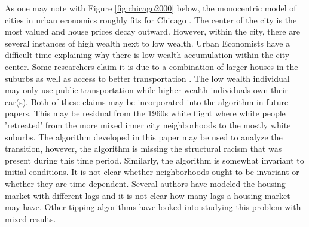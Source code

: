 \documentclass[11pt]{asaproc}
\newcommand{\1}{\mathbb{1}}
\begin{document}
As one may note with Figure \ref{fig:chicago2000} below, the monocentric model of cities in urban economics roughly fits for Chicago \citep{brueckner87}. The center of the city is the most valued and house prices decay outward. However, within the city, there are several instances of high wealth next to low wealth. Urban Economists have a difficult time explaining why there is low wealth accumulation within the city center. Some researchers claim it is due to a combination of larger houses in the suburbs as well as access to better transportation \citep{glaeser08a}. The low wealth individual may only use public transportation while higher wealth individuals own their car(s). Both of these claims may be incorporated into the algorithm in future papers. This may be residual from the 1960s white flight where white people 'retreated' from the more mixed inner city neighborhoods to the mostly white suburbs. The algorithm developed in this paper may be used to analyze the transition, however, the algorithm is missing the structural racism that was present during this time period\citep{cutler97, cutler99}. Similarly, the algorithm is somewhat invariant to initial conditions\citep{zhang11}. It is not clear whether neighborhoods ought to be invariant or whether they are time dependent. Several authors have modeled the housing market with different lags and it is not clear how many lags a housing market may have\citep{glaeser07}. Other tipping algorithms have looked into studying this problem with mixed results\citep{card07}.
\end{document}
